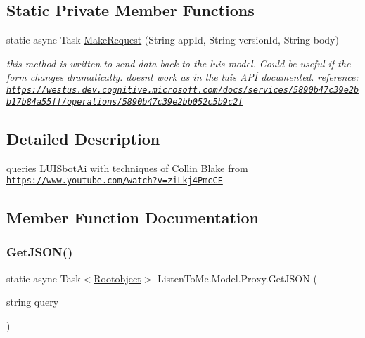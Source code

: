 \subsection*{Static Private Member Functions}
\begin{DoxyCompactItemize}
\item 
static async Task \mbox{\hyperlink{class_listen_to_me_1_1_model_1_1_proxy_a37a55aec58b3df6abab1caedc017df9b}{Make\+Request}} (String app\+Id, String version\+Id, String body)
\begin{DoxyCompactList}\small\item\em this method is written to send data back to the luis-\/model. Could be useful if the form changes dramatically. doesn\textquotesingle{}t work as in the luis A\+PÍ documented. reference\+: \href{https://westus.dev.cognitive.microsoft.com/docs/services/5890b47c39e2bb17b84a55ff/operations/5890b47c39e2bb052c5b9c2f}{\tt https\+://westus.\+dev.\+cognitive.\+microsoft.\+com/docs/services/5890b47c39e2bb17b84a55ff/operations/5890b47c39e2bb052c5b9c2f} \end{DoxyCompactList}\end{DoxyCompactItemize}


\subsection{Detailed Description}
queries L\+U\+I\+Sbot\+Ai with techniques of Collin Blake from \href{https://www.youtube.com/watch?v=ziLkj4PmcCE}{\tt https\+://www.\+youtube.\+com/watch?v=zi\+Lkj4\+Pmc\+CE} 



\subsection{Member Function Documentation}
\mbox{\label{class_listen_to_me_1_1_model_1_1_proxy_a5207b409f3a97f2450e9dce1108a6da1}} 
\subsubsection{\texorpdfstring{Get\+J\+S\+O\+N()}{GetJSON()}}
{\footnotesize\ttfamily static async Task$<$\mbox{\hyperlink{class_listen_to_me_1_1_model_1_1_rootobject}{Rootobject}}$>$ Listen\+To\+Me.\+Model.\+Proxy.\+Get\+J\+S\+ON (\begin{DoxyParamCaption}\item[{string}]{query }\end{DoxyParamCaption})\hspace{0.3cm}{\ttfamily [static]}}



